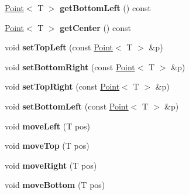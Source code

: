 \begin{DoxyCompactItemize}
\item 
\hypertarget{class_box_a0e7e1c5254740268ba77c9a0b27a4f06}{
\hyperlink{class_point}{Point}$<$ T $>$ {\bfseries getBottomLeft} () const }
\label{class_box_a0e7e1c5254740268ba77c9a0b27a4f06}

\item 
\hypertarget{class_box_a00bad5a203145629dabf2c90d79d9967}{
\hyperlink{class_point}{Point}$<$ T $>$ {\bfseries getCenter} () const }
\label{class_box_a00bad5a203145629dabf2c90d79d9967}

\item 
\hypertarget{class_box_ae155e4095a60d21cdd3677e018ef25c9}{
void {\bfseries setTopLeft} (const \hyperlink{class_point}{Point}$<$ T $>$ \&p)}
\label{class_box_ae155e4095a60d21cdd3677e018ef25c9}

\item 
\hypertarget{class_box_adbec284811aeec462e064a28f7aaaa8c}{
void {\bfseries setBottomRight} (const \hyperlink{class_point}{Point}$<$ T $>$ \&p)}
\label{class_box_adbec284811aeec462e064a28f7aaaa8c}

\item 
\hypertarget{class_box_a87df2c9be2d8d144df1e47e1150b9132}{
void {\bfseries setTopRight} (const \hyperlink{class_point}{Point}$<$ T $>$ \&p)}
\label{class_box_a87df2c9be2d8d144df1e47e1150b9132}

\item 
\hypertarget{class_box_a228cf7f5dcfd1013b647d524a4ce5148}{
void {\bfseries setBottomLeft} (const \hyperlink{class_point}{Point}$<$ T $>$ \&p)}
\label{class_box_a228cf7f5dcfd1013b647d524a4ce5148}

\item 
\hypertarget{class_box_aa656edcbbfa8c22092bc2928e792db93}{
void {\bfseries moveLeft} (T pos)}
\label{class_box_aa656edcbbfa8c22092bc2928e792db93}

\item 
\hypertarget{class_box_a082c2eb93743c2bb2e8d2873a110bdb6}{
void {\bfseries moveTop} (T pos)}
\label{class_box_a082c2eb93743c2bb2e8d2873a110bdb6}

\item 
\hypertarget{class_box_a224e6b7f6da28d3e72d8abac92d0559f}{
void {\bfseries moveRight} (T pos)}
\label{class_box_a224e6b7f6da28d3e72d8abac92d0559f}

\item 
\hypertarget{class_box_a5a5a2ff82018b2b385ed3ad222b081e4}{
void {\bfseries moveBottom} (T pos)}
\label{class_box_a5a5a2ff82018b2b385ed3ad222b081e4}


\end{DoxyCompactItemize}
